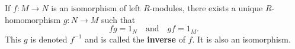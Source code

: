 If $f: M \to N$ is an isomorphism of left $R$-modules, there exists a unique $R$-homomorphism $g: N \to M$ such that
$$fg = 1_N \quad \text{and} \quad gf = 1_M.$$
This $g$ is denoted $f^{-1}$ and is called the \textbf{inverse} of $f$. It is also an isomorphism.
